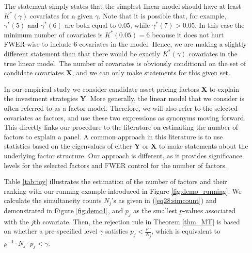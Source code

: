 \documentclass[11pt]{article}
\begin{document}
	The statement simply states that the simplest linear model should have at least $K^*(\gamma)$ covariates for a given $\gamma$. Note that it is possible that, for example, $\gamma^*(5)$ and $\gamma^*(6)$ are both equal to $0.05$, while $\gamma^*(7)>0.05$. In this case the minimum number of covariates is $K^*(0.05)=6$ because it does not hurt FWER-wise to include 6 covariates in the model. Hence, we are making a slightly different statement than that there would be exactly $K^*(\gamma)$ covariates in the true linear model. The number of covariates is obviously conditional on the set of candidate covariates $\bm{X}$, and we can only make statements for this given set. 
	
	In our empirical study we consider candidate asset pricing factors $\bm{X}$ to explain the investment strategies $\bm{Y}$. More generally, the linear model that we consider is often referred to as a factor model. Therefore, we will also refer to the selected covariates as factors, and use these two expressions as synonyms moving forward. This directly links our procedure to the literature on estimating the number of factors to explain a panel. A common approach in this literature is to use statistics based on the eigenvalues of either $\bm{Y}$ or $\bm{X}$ to make statements about the underlying factor structure. Our approach is different, as it provides significance levels for the selected factors and FWER control for the number of factors.
	
	
	
	Table \ref{tab:toy} illustrates the estimation of the number of factors and their ranking with our running example introduced in Figure \ref{fig:demo_running}. We calculate the simultaneity counts $N_j$'s as given in (\ref{eq28:simcount}) and demonstrated in Figure \ref{fig:demo1}, and $p_j$ as the smallest $p$-values associated with the $j$th covariate. Then, the rejection rule in Theorem \ref{thm_MT} is based on whether a pre-specified level $\gamma$ satisfies $p_j<\frac{\rho \gamma}{N_j}$, which is equivalent to $\rho ^{-1}\cdot N_j\cdot p_j <\gamma$. 
	
\end{document}
